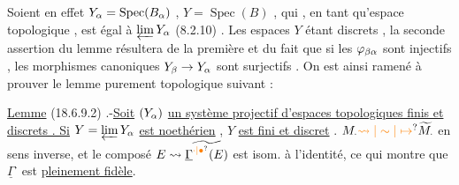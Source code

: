 Soient en effet $Y_{\alpha}=\operatorname{Spec}(B_{\alpha})$ , $Y=\operatorname{Spec}(B)$ , qui , en tant qu'espace topologique
, est égal à $\varprojlim Y_{\alpha}$ (8.2.10) . Les espaces $Y$ étant   discrets , la seconde
assertion du lemme résultera de la première et du fait que si les $\varphi_{\beta\alpha}$
sont injectifs , les morphismes canoniques $Y_{\beta}\to Y_{\alpha}$ sont surjectifs . On est
ainsi ramené à prouver le lemme purement topologique suivant :

\uline{Lemme} (18.6.9.2) .-\uline{Soit} $(Y_{\alpha})$ \uline{un système projectif d'espaces topologiques finis
et discrets . Si} $Y=\varprojlim Y_{\alpha}$ \uline{est noethérien} , $Y$ \uline{est fini et discret} .
$M_{\cdot}\unsure{\leadsto|\sim|\mapsto}\widetilde M_{\cdot}$ en sens inverse,  et le composé 
$E\leadsto\widetilde{\underline{\Gamma}^{\unsure{\cdot|\bullet}}(E)}$ est isom. à l'identité, ce qui
montre que $\underline{\Gamma}^{\cdot}$ est \uline{pleinement fidèle}.

